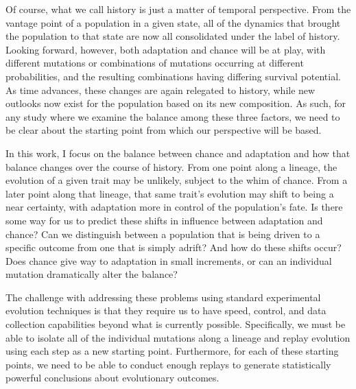 Of course, what we call history is just a matter of temporal perspective.
From the vantage point of a population in a given state, all of the dynamics that brought the population to that state are now all consolidated under the label of history.
Looking forward, however, both adaptation and chance will be at play, with different mutations or combinations of mutations occurring at different probabilities, and the resulting combinations having differing survival potential.
As time advances, these changes are again relegated to history, while new outlooks now exist for the population based on its new composition.
As such, for any study where we examine the balance among these three factors, we need to be clear about the starting point from which our perspective will be based.

In this work, I focus on the balance between chance and adaptation and how that balance changes over the course of history.
From one point along a lineage, the evolution of a given trait may be unlikely, subject to the whim of chance.
From a later point along that lineage, that same trait's evolution may shift to being a near certainty, with adaptation more in control of the population's fate.
Is there some way for us to predict these shifts in influence between adaptation and chance?
Can we distinguish between a population that is being driven to a specific outcome from one that is simply adrift?
And how do these shifts occur?
Does chance give way to adaptation in small increments, or can an individual mutation dramatically alter the balance?

The challenge with addressing these problems using standard experimental evolution techniques is that they require us to have speed, control, and data collection capabilities beyond what is currently possible.
Specifically, we must be able to isolate all of the individual mutations along a lineage and replay evolution using each step as a new starting point.
Furthermore, for each of these starting points, we need to be able to conduct enough replays to generate statistically powerful conclusions about evolutionary outcomes.

